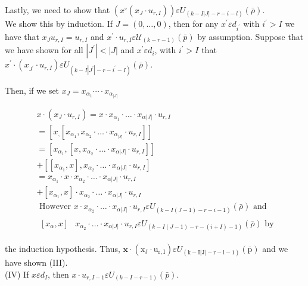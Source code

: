 \documentclass[10pt]{article}
\begin{document}
Lastly, we need to show that $\left(x^{\circ}\left(x_{J} \cdot u_{r, I}\right)\right) \varepsilon U_{(k-I|J|-r-i-l)}(\bar{\rho})$.\\
We show this by induction. If $J=(0, \ldots, 0)$, then for any $x^{\prime} \varepsilon d_{i^{\prime}}$ with $i^{\prime}>I$ we have that $x_{J} u_{r, I}=u_{r, I}$ and $x^{\prime} \cdot u_{r, I} \varepsilon \mathcal{U}_{(k-r-1)}(\bar{p})$ by assumption. Suppose that we have shown for all $\left|J^{\prime}\right|<|J|$ and $x^{\prime} \varepsilon d_{i}$, with $i^{\prime}>I$ that $x^{\prime} \cdot\left(x_{J^{\prime}} \cdot u_{r, I}\right) \varepsilon U_{\left(k-I\left|J^{\prime}\right|-r-i^{\prime}-I\right)}(\bar{\rho})$.

Then, if we set $x_{J}=x_{\alpha_{1}} \cdots \cdot x_{\alpha_{|J|}}$


\begin{align*}
& x \cdot\left(x_{J} \cdot u_{r, I}\right)=x \cdot x_{\alpha_{1}} \cdot \ldots \cdot x_{\alpha|J|} \cdot u_{r, I} \\
&=\left[x_{,}\left[x_{\alpha_{1}}, x_{\alpha_{2}} \cdot \ldots \cdot x_{\alpha_{|J|}} \cdot u_{r, I}\right]\right]  \tag{by2.2.3}\\
&=\left[x_{\alpha_{1}},\left[x, x_{\alpha_{2}} \cdot \ldots \cdot x_{\alpha|J|} \cdot u_{r, I}\right]\right] \\
&+\left[\left[x_{\alpha_{1}}, x\right], x_{\alpha_{2}} \cdot \ldots \cdot x_{\alpha|J|} \cdot u_{r, I}\right] \\
&=x_{\alpha_{1}} \cdot x \cdot x_{\alpha_{2}} \cdot \ldots \cdot x_{\alpha|J|} \cdot u_{r, I} \\
&+\left[x_{\alpha_{1}}, x\right] \cdot x_{\alpha_{2}} \cdot \ldots \cdot x_{\alpha|J|} \cdot u_{r, I} \\
& \text { However } x \cdot x_{\alpha_{2}} \cdot \ldots \cdot x_{\alpha|J|} \cdot u_{r, I} \varepsilon U_{(k-I(J-1)-r-i-1)}(\bar{\rho}) \text { and } \\
& \begin{aligned}
{\left[x_{\alpha}, x\right] } & x_{\alpha_{2}} \cdot \ldots \cdot x_{\alpha|J|} \cdot u_{r, I} \varepsilon U_{(k-I(J-1)-r-(i+I)-1)}(\bar{\rho}) \text { by }
\end{aligned}
\end{align*}


the induction hypothesis. Thus, $\mathbf{x} \cdot\left(\mathrm{x}_{\mathrm{J}} \cdot \mathrm{u}_{\mathrm{r}, \mathrm{I}}\right) \varepsilon U_{(\mathrm{k}-\mathrm{I}|\mathrm{J}|-\mathrm{r}-\mathrm{i}-1)}(\overline{\mathrm{p}})$ and we have shown (III).\\
(IV) If $x \varepsilon d_{I}$, then $x \cdot u_{r, I-1} \varepsilon U_{(k-I-r-1)}(\bar{p})$.
\end{document}
